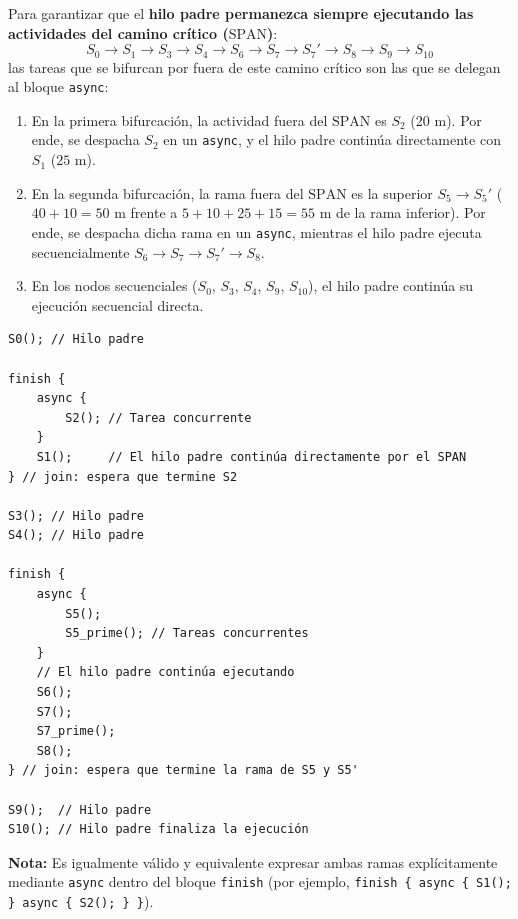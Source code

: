 \documentclass[11pt,a4paper]{article}
\begin{document}
\vspace{0.5em}
\noindent Para garantizar que el \textbf{hilo padre permanezca siempre ejecutando las actividades del camino crítico ($\text{SPAN}$)}:
\[ S_0 \to S_1 \to S_3 \to S_4 \to S_6 \to S_7 \to S_7' \to S_8 \to S_9 \to S_{10} \]
las tareas que se bifurcan por fuera de este camino crítico son las que se delegan al bloque \texttt{async}:
\begin{enumerate}[noitemsep]
    \item En la primera bifurcación, la actividad fuera del $\text{SPAN}$ es $S_2$ ($20\text{ m}$). Por ende, se despacha $S_2$ en un \texttt{async}, y el hilo padre continúa directamente con $S_1$ ($25\text{ m}$).
    \item En la segunda bifurcación, la rama fuera del $\text{SPAN}$ es la superior $S_5 \to S_5'$ ($40 + 10 = 50\text{ m}$ frente a $5 + 10 + 25 + 15 = 55\text{ m}$ de la rama inferior). Por ende, se despacha dicha rama en un \texttt{async}, mientras el hilo padre ejecuta secuencialmente $S_6 \to S_7 \to S_7' \to S_8$.
    \item En los nodos secuenciales ($S_0$, $S_3$, $S_4$, $S_9$, $S_{10}$), el hilo padre continúa su ejecución secuencial directa.
\end{enumerate}

\begin{verbatim}
S0(); // Hilo padre

finish {
    async {
        S2(); // Tarea concurrente
    }
    S1();     // El hilo padre continúa directamente por el SPAN
} // join: espera que termine S2 

S3(); // Hilo padre
S4(); // Hilo padre

finish {
    async {
        S5();
        S5_prime(); // Tareas concurrentes
    }
    // El hilo padre continúa ejecutando
    S6();
    S7();
    S7_prime();
    S8();
} // join: espera que termine la rama de S5 y S5'

S9();  // Hilo padre
S10(); // Hilo padre finaliza la ejecución
\end{verbatim}

\noindent \textbf{Nota:} Es igualmente válido y equivalente expresar ambas ramas explícitamente mediante \texttt{async} dentro del bloque \texttt{finish} (por ejemplo, \texttt{finish \{ async \{ S1(); \} async \{ S2(); \} \}}).\vspace{2em}


\end{document}
